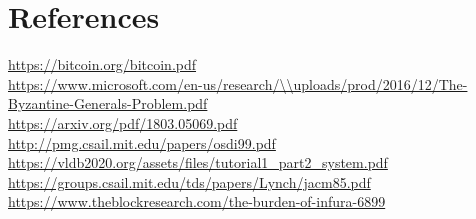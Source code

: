 \documentclass{article}
\begin{document}
\section{References}
\url{https://bitcoin.org/bitcoin.pdf}\\
\url{https://www.microsoft.com/en-us/research/\\uploads/prod/2016/12/The-Byzantine-Generals-Problem.pdf}\\
\url{https://arxiv.org/pdf/1803.05069.pdf}\\
\url{http://pmg.csail.mit.edu/papers/osdi99.pdf}\\
\url{https://vldb2020.org/assets/files/tutorial1_part2_system.pdf}\\
\url{https://groups.csail.mit.edu/tds/papers/Lynch/jacm85.pdf}\\
\url{https://www.theblockresearch.com/the-burden-of-infura-6899}
\end{document}
